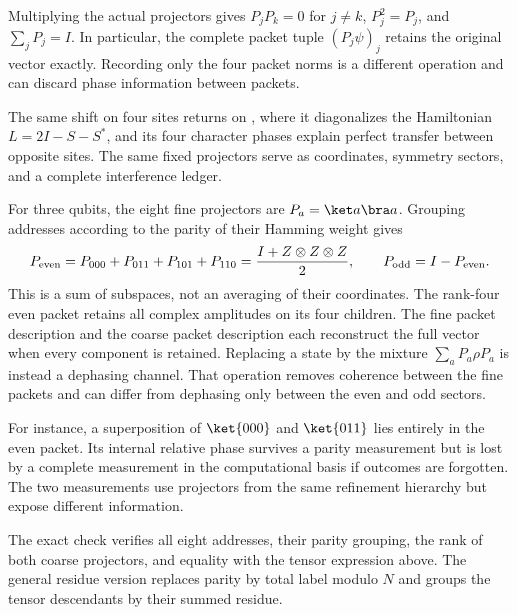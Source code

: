 Multiplying the actual projectors gives $P_jP_k=0$ for $j\ne k$, $P_j^2=P_j$, and $\sum_jP_j=I$. In particular, the complete packet tuple $(P_j\psi)_j$ retains the original vector exactly. Recording only the four packet norms is a different operation and can discard phase information between packets.

The same shift on four sites returns on , where it diagonalizes the Hamiltonian $L=2I-S-S^*$, and its four character phases explain perfect transfer between opposite sites. The same fixed projectors serve as coordinates, symmetry sectors, and a complete interference ledger.

For three qubits, the eight fine projectors are $P_a=\ket a\bra a$. Grouping addresses according to the parity of their Hamming weight gives
\[
P_{\rm even}=P_{000}+P_{011}+P_{101}+P_{110}
=\frac{I+Z\otimes Z\otimes Z}{2},
\qquad P_{\rm odd}=I-P_{\rm even}.
\]
This is a sum of subspaces, not an averaging of their coordinates. The rank-four even packet retains all complex amplitudes on its four children.
The fine packet description and the coarse packet description each reconstruct the full vector when every component is retained. Replacing a state by the mixture $\sum_aP_a\rho P_a$ is instead a dephasing channel. That operation removes coherence between the fine packets and can differ from dephasing only between the even and odd sectors.

For instance, a superposition of $\ket{000}$ and $\ket{011}$ lies entirely in the even packet. Its internal relative phase survives a parity measurement but is lost by a complete measurement in the computational basis if outcomes are forgotten. The two measurements use projectors from the same refinement hierarchy but expose different information.

The exact check verifies all eight addresses, their parity grouping, the rank of both coarse projectors, and equality with the tensor expression above. The general residue version replaces parity by total label modulo $N$ and groups the tensor descendants by their summed residue.


